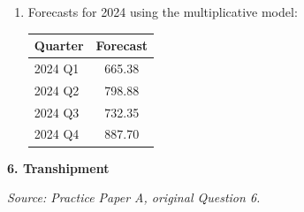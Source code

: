\documentclass[11pt,a4paper]{article}
\begin{document}
\begin{enumerate}
For the multiplicative model:
\[
|636-626.93|=9.07,\quad |760-753.38|=6.62,\quad |692-691.23|=0.77,\quad |852-838.54|=13.46
\]
so
\[
\text{MAD}_{\text{mult}}=\frac{9.07+6.62+0.77+13.46}{4}\approx 7.48
\]

For the additive model:
\[
|636-634.60|=1.40,\quad |760-750.36|=9.64,\quad |692-697.13|=5.13,\quad |852-824.52|=27.48
\]
so
\[
\text{MAD}_{\text{add}}=\frac{1.40+9.64+5.13+27.48}{4}\approx 10.91
\]
The multiplicative model is better.

\item Forecasts for 2024 using the multiplicative model:

\begin{center}
\begin{tabular}{lc}
\toprule
Quarter & Forecast \\
\midrule
2024 Q1 & 665.38 \\
2024 Q2 & 798.88 \\
2024 Q3 & 732.35 \\
2024 Q4 & 887.70 \\
\bottomrule
\end{tabular}
\end{center}
\end{enumerate}

\newpage

\textbf{6. Transhipment}

\textit{Source: Practice Paper A, original Question 6.}
\end{document}
